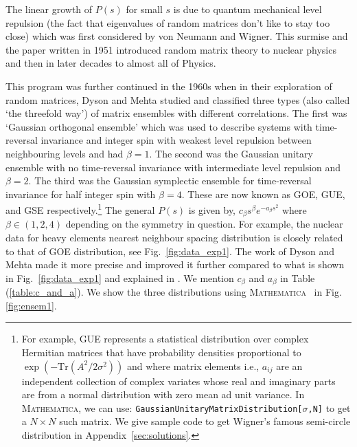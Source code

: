 \documentclass[letter,11pt]{article}
\newcommand{\MA}{\textsc{Mathematica}}
\begin{document}
The linear growth of $P(s)$ for small $s$ is due to quantum mechanical level repulsion (the fact that eigenvalues of random matrices don't like to stay too close)
which was first considered by von Neumann and Wigner. 
This surmise and the paper written in 1951
\cite{Wigner1951OnTS} introduced random matrix theory 
to nuclear physics and then in later decades to almost all of Physics.

This program was further continued in the 1960s when in their exploration of random matrices, Dyson and Mehta studied and classified three types (also called `the threefold way') of matrix ensembles with different correlations. The first was `Gaussian orthogonal ensemble' which was used to describe systems with time-reversal invariance and integer spin with weakest level repulsion between neighbouring levels and had $\beta=1$. The second was the Gaussian unitary ensemble with no time-reversal invariance with intermediate level repulsion and $\beta=2$. The third was the Gaussian symplectic ensemble for time-reversal invariance for half integer spin with $\beta=4$. These are now known as GOE, GUE, and GSE respectively.\footnote{For example, GUE represents a statistical distribution over complex Hermitian matrices 
that have probability densities proportional to $ \exp(-\mbox{Tr}(A^2/2\sigma^2))$ and
where matrix elements i.e., $a_{ij}$ are an independent collection of complex 
variates whose real and imaginary parts are from a normal distribution
with zero mean ad unit variance. In \MA, we can use: 
\texttt{GaussianUnitaryMatrixDistribution[$\sigma$,N]}
to get a $N \times N$ such matrix. We give sample code to get Wigner's famous semi-circle
distribution in Appendix~\ref{sec:solutions}.} 
The general $P(s)$ is given by, $c_{\beta}s^{\beta} e^{-a_{\beta}s^2}$ 
where $\beta \in (1,2,4)$ depending on the symmetry in question. 
For example, the nuclear data for heavy elements nearest neighbour spacing distribution
is closely related to that of GOE distribution, see Fig.~\ref{fig:data_exp1}. 
The work of Dyson and Mehta made it more precise and improved it further 
compared to what is shown in Fig.~\ref{fig:data_exp1} and explained in 
\cite{PhysRevLett.48.1086}. We mention $c_{\beta}$ and  $a_{\beta}$ in Table (\ref{table:c_and_a}). 
We show the three distributions using \MA~ in Fig. \ref{fig:ensem1}.  
\end{document}
